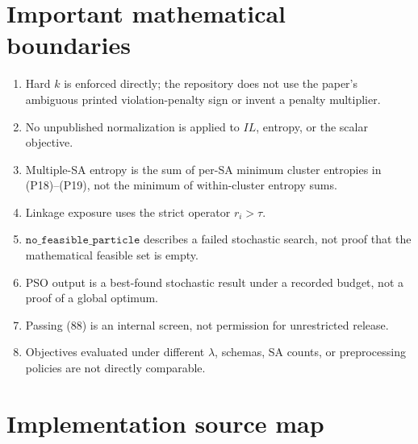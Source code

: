\documentclass[11pt,a4paper]{article}
\newcommand{\code}[1]{\texttt{#1}}
\begin{document}
\section{Important mathematical boundaries}

\begin{enumerate}
  \item Hard $k$ is enforced directly; the repository does not use the paper's
  ambiguous printed violation-penalty sign or invent a penalty multiplier.
  \item No unpublished normalization is applied to $IL$, entropy, or the
  scalar objective.
  \item Multiple-SA entropy is the sum of per-SA minimum cluster entropies in
  (P18)--(P19), not the minimum of within-cluster entropy sums.
  \item Linkage exposure uses the strict operator $r_i>\tau$.
  \item $\code{no\_feasible\_particle}$ describes a failed stochastic search,
  not proof that the mathematical feasible set is empty.
  \item PSO output is a best-found stochastic result under a recorded budget,
  not a proof of a global optimum.
  \item Passing (88) is an internal screen, not permission for unrestricted
  release.
  \item Objectives evaluated under different $\lambda$, schemas, SA counts,
  or preprocessing policies are not directly comparable.
\end{enumerate}

\appendix
\section{Implementation source map}
\end{document}
